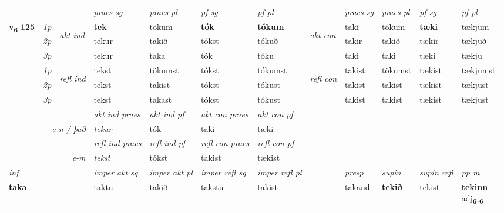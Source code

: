\begin{longtable}[l]{X>{\footnotesize\itshape}llXXXXlXXXX}
 & &   & \textit{praes sg}  & \textit{praes pl}    & \textit{ pf sg} & \textit{pf pl} & & \textit{praes sg}  & \textit{praes pl}    & \textit{pf sg} & \textit{pf pl }  \\ \cmidrule{4-7} \cmidrule{9-12}
 \multirow{2}{*}{{{\textbf{v{\textsubscript{6}}} \Large{\textbf{125}}}}}  & 1p & \multirow{3}{*}{\begin{turn}{90}\textit{akt ind}\end{turn}} & \textbf{tek} & tökum & \textbf{tók} & \textbf{tókum} & \multirow{3}{*}{\begin{turn}{90}\textit{akt con}\end{turn}} &taki & tökum & \textbf{tæki} & tækjum\\*
 & 2p &  &  tekur  & takið & tókst & tókuð & & takir & takið & tækir & tækjuð \\*
 & 3p &  & tekur & taka & tók & tóku & & taki & taki& tæki & tækju \\*
\cmidrule{4-7} \cmidrule{9-12}
 & 1p & \multirow{3}{*}{\begin{turn}{90}\textit{refl ind}\end{turn}}  & tekst & tökumst & tókst & tókumst & \multirow{3}{*}{\begin{turn}{90}\textit{refl con}\end{turn}}  &takist & tökumst & tækist & tækjumst \\*
 & 2p &  & tekst & takist & tókst & tókust & &takist & takist & tækist & tækjust \\*
 & 3p  & & tekst & takast & tókst & tókust & & takist & takist& tækist & tækjust \\*
\cmidrule{4-7} \cmidrule{9-12}

   && &  \textit{akt ind praes} & \textit{akt ind pf} & \textit{akt con praes} & \textit{akt con pf} \\*
\multicolumn{3}{r}{\textit{e-n / það}} & tekur & tók & taki & tæki \\*

\cmidrule{4-7}
 & && \textit{refl ind praes} & \textit{refl ind pf} & \textit{refl con praes} & \textit{refl con pf} \\*
\multicolumn{3}{r}{\textit{e-m}}& tekst & tókst & takist & tækist \\*

\cmidrule{4-7}
   {\textit{inf}} & &  & \textit{imper akt sg} & \textit{imper akt pl} & \textit{imper refl sg} & \textit{imper refl pl} && \textit{presp} & \textit{supin} & \textit{supin refl} & \textit{pp m} \\*
  {\textbf{taka}} & && taktu  & takið & takstu & takist && takandi &  \textbf{tekið} & tekist & \specialcell{\textbf{tekinn} \\ adj\textbf{\textsubscript{6-6}}} \\*


\end{longtable}
